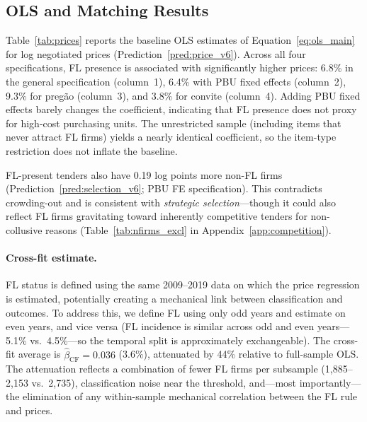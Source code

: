 
\subsection{OLS and Matching Results}
\label{sec:results_ols}

Table~\ref{tab:prices} reports the baseline OLS estimates of
Equation~\eqref{eq:ols_main} for log negotiated prices
(Prediction~\ref{pred:price_v6}). Across all four
specifications, FL presence is associated with significantly higher
prices: 6.8\% in the general specification (column~1), 6.4\% with PBU
fixed effects (column~2), 9.3\% for preg\~ao (column~3), and 3.8\% for
convite (column~4). Adding PBU fixed effects barely changes the
coefficient, indicating that FL presence does not proxy for high-cost
purchasing units. The unrestricted sample (including items that never
attract FL firms) yields a nearly identical coefficient, so the
item-type restriction does not inflate the baseline.



FL-present tenders also have 0.19 log points more non-FL firms
(Prediction~\ref{pred:selection_v6}; PBU FE specification). This
contradicts crowding-out and is consistent with \emph{strategic
selection}---though it could also reflect FL firms gravitating toward
inherently competitive tenders for non-collusive reasons
(Table~\ref{tab:nfirms_excl} in Appendix~\ref{app:competition}).

\paragraph{Cross-fit estimate.}
FL status is defined using the same 2009--2019 data on which the price
regression is estimated, potentially creating a mechanical link between
classification and outcomes. To address this, we define FL using only odd years and estimate on
even years, and vice versa (FL incidence is similar across odd and
even years---5.1\% vs.\ 4.5\%---so the temporal split is
approximately exchangeable). The cross-fit
average is $\hat{\beta}_{\text{CF}} = 0.036$ (3.6\%), attenuated by
44\% relative to full-sample OLS. The attenuation reflects a
combination of fewer FL firms per subsample
(1,885--2,153 vs.\ 2,735), classification noise near the threshold,
and---most importantly---the elimination of any within-sample
mechanical correlation between the FL rule and prices.

